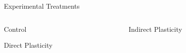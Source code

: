 \vspace{1ex}
\begin{block}{Experimental Treatments}
\vspace{-1ex}
\begin{columns}
\begin{column}{0.5\textwidth}
\begin{alertblock}{Control}

\end{alertblock}
\begin{alertblock}{Direct Plasticity}

\end{alertblock}
\end{column}
\begin{column}{0.5\textwidth}
\begin{alertblock}{Indirect Plasticity}

\end{alertblock}
\end{column}
\end{columns}
\end{block}

